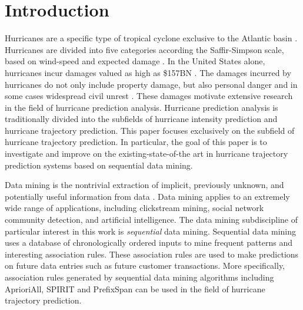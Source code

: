 \documentclass[12pt,conference]{IEEEtran}
\begin{document}
\IEEEpeerreviewmaketitle

\section{Introduction}

Hurricanes are a specific type of tropical cyclone exclusive to the Atlantic basin \cite{def-hurricane}. Hurricanes are divided into five categories according the Saffir-Simpson scale, based on wind-speed and expected damage \cite{hurricane-cat}. In the United States alone, hurricanes incur damages valued as high as \$157BN \cite{hurricane-cost}. The damages incurred by hurricanes do not only include property damage, but also personal danger and in some cases widespread civil unrest \cite{hurricane-cost-non-financial}. These damages motivate extensive research in the field of hurricane prediction analysis. Hurricane prediction analysis is traditionally divided into the subfields of hurricane intensity prediction and hurricane trajectory prediction. This paper focuses exclusively on the subfield of hurricane trajectory prediction. In particular, the goal of this paper is to investigate and improve on the existing-state-of-the art in hurricane trajectory prediction systems based on sequential data mining.

Data mining is the nontrivial extraction of implicit, previously unknown, and potentially useful information from data \cite{data mining-def}. Data mining applies to an extremely wide range of applications, including clickstream mining, social network community detection, and artificial intelligence. The data mining subdiscipline of particular interest in this work is \textit{sequential} data mining. Sequential data mining uses a database of chronologically ordered inputs to mine frequent patterns and interesting association rules. These association rules are used to make predictions on future data entries such as future customer transactions. More specifically, association rules generated by sequential data mining algorithms including AprioriAll, SPIRIT and PrefixSpan can be used in the field of hurricane trajectory prediction. 
\end{document}
